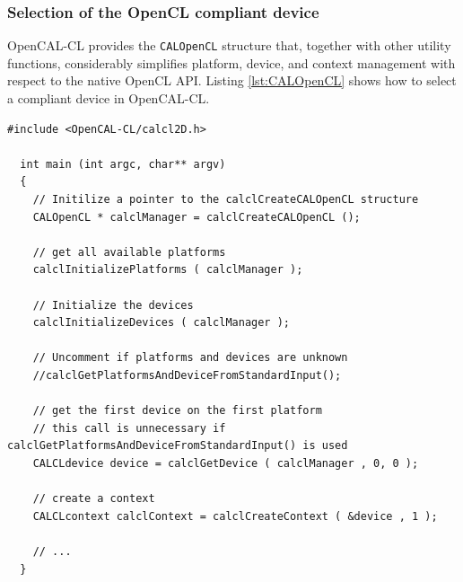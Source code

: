\subsubsection{Selection of the OpenCL compliant device}

OpenCAL-CL provides the \verb'CALOpenCL' structure that, together with
other utility functions, considerably simplifies platform, device, and
context management with respect to the native OpenCL API. Listing
\ref{lst:CALOpenCL} shows how to select a compliant device in
OpenCAL-CL.

\begin{lstlisting}[float,floatplacement=H, label=lst:CALOpenCL, caption=Access to platform and devices.]
  #include <OpenCAL-CL/calcl2D.h>

  int main (int argc, char** argv)
  {
    // Initilize a pointer to the calclCreateCALOpenCL structure
    CALOpenCL * calclManager = calclCreateCALOpenCL ();

    // get all available platforms
    calclInitializePlatforms ( calclManager );

    // Initialize the devices
    calclInitializeDevices ( calclManager );

    // Uncomment if platforms and devices are unknown
    //calclGetPlatformsAndDeviceFromStandardInput();

    // get the first device on the first platform
    // this call is unnecessary if calclGetPlatformsAndDeviceFromStandardInput() is used
    CALCLdevice device = calclGetDevice ( calclManager , 0, 0 );

    // create a context
    CALCLcontext calclContext = calclCreateContext ( &device , 1 );

    // ...
  }
\end{lstlisting}

